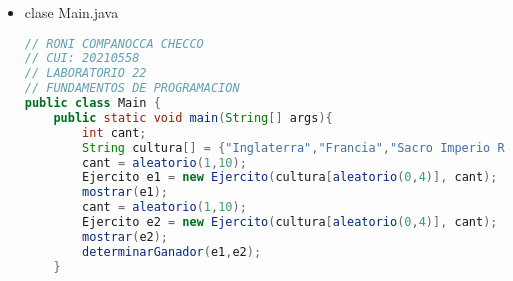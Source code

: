 \documentclass{article}
\begin{document}
\begin{itemize}
\begin{lstlisting}[language=java]
    //COMSTRUCTORES
	public Soldado(String nomb, int ataque, int defensa, int vida) {
		nombre = nomb;
        nivelAtaque = ataque;
        nivelDefensa = defensa;
        nivelVida = vida;
        vidaActual = vida;
        num++;
	}

	// Otros métodos
    public void atacar() {
        actitud = "ataque";
        avanzar();
    }

    public void defender() {
        actitud = "defensa";
        velocidad = 0;
    }

    public void avanzar() {
        velocidad++;
    }

    public void retroceder() {
        velocidad--;
    }

    public void serAtacado() {
        vidaActual--;
        if (vidaActual == 0) 
            morir();
    }

    public void huir(){
        actitud = "fuga";
        velocidad++;
    }

    public void morir() {
        vive = false;
    }

    public String toString() {
        return nombre+ " " +nivelAtaque+ " "+nivelDefensa+ " " +nivelVida+ " " +vidaActual+ " " +velocidad+ " " +actitud+ " " +vive;
    }

    public static int cuantos(){
        return num;
    }

    public static void resetearCantidad(){
        num=0;
    }

    public int getVida(){
        return nivelVida;
    }

    public String getActitud(){
        return actitud;
    }

    public void setNivelDefensa(int nivelDefensa) {
        this.nivelDefensa = nivelDefensa;
    }

    public int getNivelDefensa(){
        return nivelDefensa;
    }
}
        \end{lstlisting}

        \item clase Main.java
        \begin{lstlisting}[language=java]
// RONI COMPANOCCA CHECCO
// CUI: 20210558
// LABORATORIO 22
// FUNDAMENTOS DE PROGRAMACION 
public class Main {
    public static void main(String[] args){
        int cant;
        String cultura[] = {"Inglaterra","Francia","Sacro Imperio Romano Germanico","Aragon","Moros"};
        cant = aleatorio(1,10);
        Ejercito e1 = new Ejercito(cultura[aleatorio(0,4)], cant);
        mostrar(e1);
        cant = aleatorio(1,10);
        Ejercito e2 = new Ejercito(cultura[aleatorio(0,4)], cant);
        mostrar(e2);
        determinarGanador(e1,e2);
    }
    

\end{lstlisting}
\end{itemize}
\end{document}
